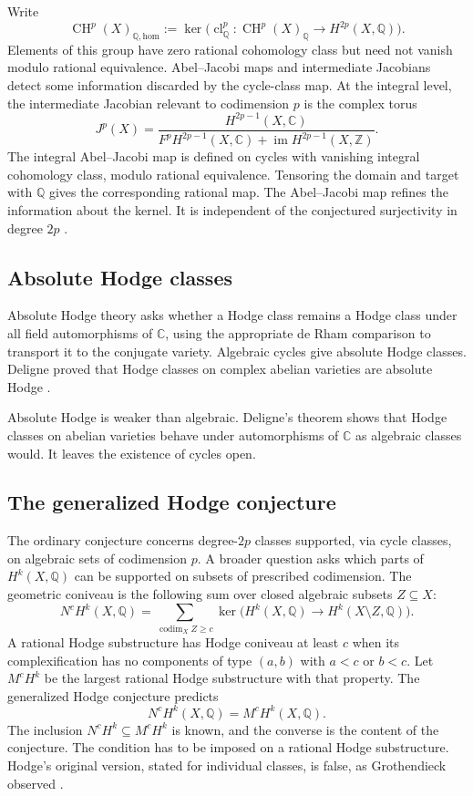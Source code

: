 \documentclass[11pt,reqno]{amsart}
\theoremstyle{definition}
\theoremstyle{remark}
\numberwithin{equation}{section}
\newcommand{\C}{\mathbb{C}}
\newcommand{\Z}{\mathbb{Z}}
\newcommand{\Q}{\mathbb{Q}}
\DeclareMathOperator{\CH}{CH}
\DeclareMathOperator{\cl}{cl}
\DeclareMathOperator{\im}{im}
\begin{document}
Write
\[
 \CH^p(X)_{\Q,\mathrm{hom}}
 :=\ker\bigl(\cl^p_{\Q}:\CH^p(X)_{\Q}\to H^{2p}(X,\Q)\bigr).
\]
Elements of this group have zero rational cohomology class but need not
vanish modulo rational equivalence. Abel--Jacobi maps and intermediate
Jacobians detect some information discarded by the cycle-class map.
At the integral level, the intermediate Jacobian relevant to codimension
$p$ is the complex torus
\[
 J^p(X)=\frac{H^{2p-1}(X,\C)}
 {F^pH^{2p-1}(X,\C)+\im H^{2p-1}(X,\Z)}.
\]
The integral Abel--Jacobi map is defined on cycles with vanishing integral
cohomology class, modulo rational equivalence. Tensoring the domain
and target with $\Q$ gives the corresponding rational map.
The Abel--Jacobi map refines the information about the kernel. It is
independent of the conjectured surjectivity in degree $2p$
\cite{voisin2003hodge2}.

\subsection{Absolute Hodge classes}

Absolute Hodge theory asks whether a Hodge class remains a Hodge class
under all field automorphisms of $\C$, using the appropriate de Rham
comparison to transport it to the conjugate variety. Algebraic cycles
give absolute Hodge classes. Deligne proved that Hodge classes on
complex abelian varieties are absolute Hodge \cite{deligne1982hodge}.

Absolute Hodge is weaker than algebraic. Deligne's theorem shows that Hodge
classes on abelian varieties behave under automorphisms of $\C$ as algebraic
classes would. It leaves the existence of cycles open.

\subsection{The generalized Hodge conjecture}

The ordinary conjecture concerns degree-$2p$ classes supported, via cycle
classes, on algebraic sets of codimension $p$. A broader question asks
which parts of $H^k(X,\Q)$ can be supported on subsets of prescribed
codimension. The geometric coniveau is the following sum over closed
algebraic subsets $Z\subseteq X$:
\[
 N^cH^k(X,\Q)=
 \sum_{\operatorname{codim}_X Z\geq c}
 \ker\bigl(H^k(X,\Q)\to H^k(X\setminus Z,\Q)\bigr).
\]
A rational Hodge substructure has Hodge coniveau at least $c$ when its
complexification has no components of type $(a,b)$ with $a<c$ or $b<c$.
Let $M^cH^k$ be the largest rational Hodge substructure with that property.
The generalized Hodge conjecture predicts
\[
 N^cH^k(X,\Q)=M^cH^k(X,\Q).
\]
The inclusion $N^cH^k\subseteq M^cH^k$ is known, and the converse is the
content of the conjecture. The condition has to be imposed on a rational
Hodge substructure. Hodge's original version, stated for individual
classes, is false, as Grothendieck observed
\cite{grothendieck1969,voisin2025coniveau}.
\end{document}
